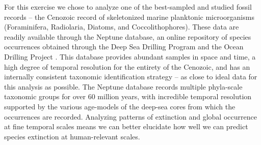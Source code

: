 \documentclass[12pt,letterpaper]{article}
\begin{document}
\begin{refsection}

For this exercise we chose to analyze one of the best-sampled and studied fossil records -- the Cenozoic record of skeletonized marine planktonic microorganisms (Foraminifera, Radiolaria, Diatoms, and Coccolithophores). These data are readily available through the Neptune database, an online repository of species occurrences obtained through the Deep Sea Drilling Program and the Ocean Drilling Project \citep{Lazarus1994,SpencerCervato1999}. This database provides abundant samples in space and time, a high degree of temporal resolution for the entirety of the Cenozoic, and has an internally consistent taxonomic identification strategy -- as close to ideal data for this analysis as possible. 
The Neptune database records multiple phyla-scale taxonomic groups for over 60 million years, with incredible temporal resolution supported by the various age-models of the deep-sea cores from which the occurrences are recorded. Analyzing patterns of extinction and global occurrence at fine temporal scales means we can better elucidate how well we can predict species extinction at human-relevant scales.



\end{refsection}
\end{document}
